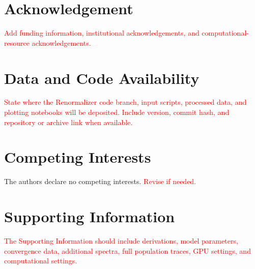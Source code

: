 \documentclass[journal=jctcce,manuscript=article]{achemso}
\newcommand{\placeholder}[1]{\textcolor{red}{#1}}
\begin{document}
\section*{Acknowledgement}

\placeholder{Add funding information, institutional acknowledgements, and computational-resource acknowledgements.}

\section*{Data and Code Availability}

\placeholder{State where the Renormalizer code branch, input scripts, processed data, and plotting notebooks will be deposited. Include version, commit hash, and repository or archive link when available.}

\section*{Competing Interests}

The authors declare no competing interests. \placeholder{Revise if needed.}

\section*{Supporting Information}

\placeholder{The Supporting Information should include derivations, model parameters, convergence data, additional spectra, full population traces, GPU settings, and computational settings.}


\end{document}
